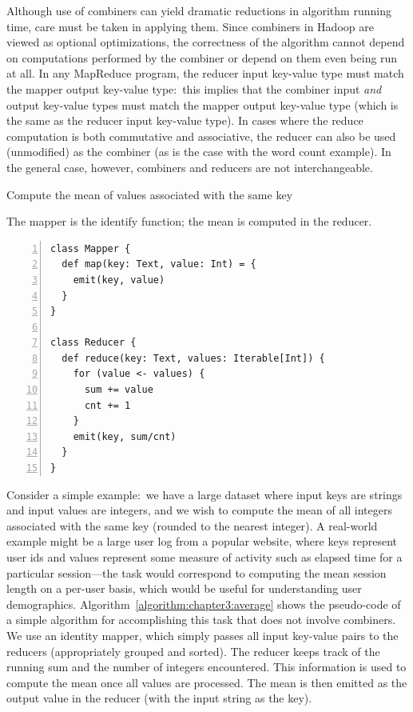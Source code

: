 \documentclass[11pt]{article}
\begin{document}
Although use of combiners can yield dramatic reductions in algorithm
running time, care must be taken in applying them.  Since combiners in
Hadoop are viewed as optional optimizations, the correctness of the
algorithm cannot depend on computations performed by the combiner or
depend on them even being run at all.  In any MapReduce program, the
reducer input key-value type must match the mapper output key-value
type:\ this implies that the combiner input \emph{and} output key-value
types must match the mapper output key-value type (which is the same
as the reducer input key-value type).  In cases where the reduce
computation is both commutative and associative, the reducer can also
be used (unmodified) as the combiner (as is the case with the word
count example).  In the general case, however, combiners and reducers
are not interchangeable.

\begin{algorithm}[t]
\caption{Compute the mean of values associated with the same key}
\label{algorithm:chapter3:average}
The mapper is the identify function; the mean is computed in the reducer.
\begin{small}
\begin{Verbatim}[numbers=left, xleftmargin=7.5mm]
class Mapper {
  def map(key: Text, value: Int) = {
    emit(key, value)
  }
}

class Reducer {
  def reduce(key: Text, values: Iterable[Int]) {
    for (value <- values) {
      sum += value
      cnt += 1
    }
    emit(key, sum/cnt)
  }
}
\end{Verbatim}
\end{small}
\end{algorithm}

Consider a simple example:\ we have a large dataset where input keys
are strings and input values are integers, and we wish to compute the
mean of all integers associated with the same key (rounded to the
nearest integer).  A real-world example might be a large user log from
a popular website, where keys represent user ids and values represent
some measure of activity such as elapsed time for a particular
session---the task would correspond to computing the mean session
length on a per-user basis, which would be useful for understanding
user demographics.  Algorithm~\ref{algorithm:chapter3:average} shows the
pseudo-code of a simple algorithm for accomplishing this task that
does not involve combiners.  We use an identity mapper, which simply
passes all input key-value pairs to the reducers (appropriately
grouped and sorted).  The reducer keeps track of the running sum and
the number of integers encountered.  This information is used to
compute the mean once all values are processed.  The mean is then
emitted as the output value in the reducer (with the input string as
the key).
\end{document}
